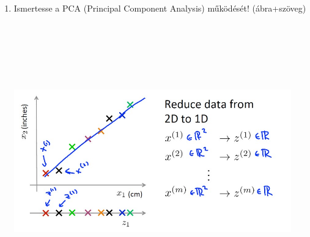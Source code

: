 \documentclass[12pt]{article}
\begin{document}
\begin{enumerate}
\item Ismertesse a PCA (Principal Component Analysis) működését! (ábra+szöveg)
\begin{center}
\includegraphics[width=12cm,height=12cm,keepaspectratio]{./pics/PCAworking.jpg}
\end{center}

\end{enumerate}
\end{document}
